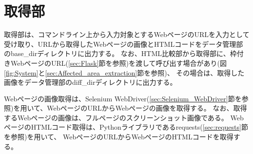 \section{取得部}\label{sec:Web_data_get_section}
取得部は、コマンドライン上から入力対象とするWebページのURLを入力として受け取り、URLから取得したWebページの画像とHTMLコードをデータ管理部のbase\_dirディレクトリに出力する。
なお、HTML比較部から取得部に、枠付きWebページのURL(\ref{sec:Flask}節を参照)を渡して呼び出す場合があり(図\ref{fig:System}と\ref{sec:Affected_area_extraction}節を参照)、
その場合は、取得した画像をデータ管理部のdiff\_dirディレクトリに出力する。
\par
Webページの画像取得は、Selenium WebDriver(\ref{sec:Selenium_WebDriver}節を参照)を用いて、WebページのURLからWebページの画像を取得する。
なお、取得するWebページの画像は、フルページのスクリーンショット画像である。
WebページのHTMLコード取得は、Pythonライブラリであるrequests(\ref{sec:requests}節を参照)を用いて、
WebページのURLからWebページのHTMLコードを取得する。

